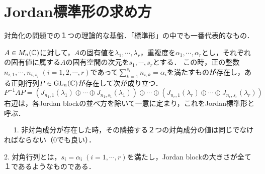 \documentclass[uplatex,dvipdfmx]{jsreport}
\begin{document}
\section{Jordan標準形の求め方}
対角化の問題での１つの理論的な基盤．「標準形」の中でも一番代表的なもの．

\begin{theorem}[Jordan標準形]
    $A\in M_n(\mathbb{C})$に対して，$A$の固有値を$\lambda_1,\cdots,\lambda_r$，重複度を$\alpha_1,\cdots,\alpha_r$とし，それぞれの固有値に属する$A$の固有空間の次元を$s_1,\cdots,s_r$とする．
    この時，正の整数$n_{i,1},\cdots,n_{i,s_i}\;(i=1,2,\cdots,r)$であって$\sum^{s_i}_{k=1}n_{i,k}=\alpha_i$を満たすものが存在し，ある正則行列$P\in\mathrm{GL}_n(\mathbb{C})$が存在して次が成り立つ．
    \[ P^{-1}AP = (J_{n_1,1}(\lambda_1)\oplus\cdots\oplus J_{n_1,s_1}(\lambda_1))\oplus\cdots\oplus(J_{n_r,1}(\lambda_r)\oplus\cdots\oplus J_{n_r,s_r}(\lambda_r)) \]
    右辺は，各Jordan blockの並べ方を除いて一意に定まり，これをJordan標準形と呼ぶ．
\end{theorem}
\begin{remark}　
    1. 非対角成分が存在した時，その隣接する２つの対角成分の値は同じでなければならない（$0$でも良い）．

    2. 対角行列とは，$s_i=\alpha_i\;(i=1,\cdots,r)$を満たし，Jordan blockの大きさが全て１であるようなものである．
\end{remark}
\end{document}
